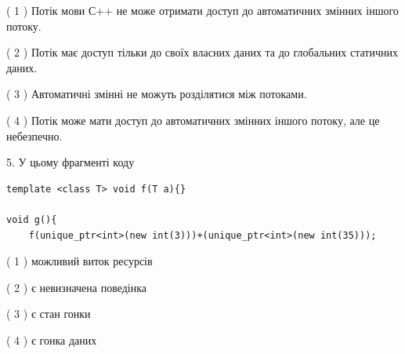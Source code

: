 \documentclass[12pt, ukrainian]{article}
\begin{document}
\begin {large}
{( 1 ) Потік мови С++ не може отримати доступ до автоматичних змінних іншого потоку.%

( 2 ) Потік має доступ тільки до своїх власних даних та до глобальних статичних даних.%

( 3 ) Автоматичні змінні не можуть розділятися між потоками.%

( 4 ) Потік може мати доступ до автоматичних змінних іншого потоку, але це небезпечно.%


5. У цьому фрагменті коду
\begin{verbatim}
template <class T> void f(T a){}

void g(){
    f(unique_ptr<int>(new int(3)))+(unique_ptr<int>(new int(35)));
\end{verbatim}

( 1 ) можливий виток ресурсів%

( 2 ) є невизначена поведінка%

( 3 ) є стан гонки%

( 4 ) є гонка даних%
}
\end {large}
\end{document}
